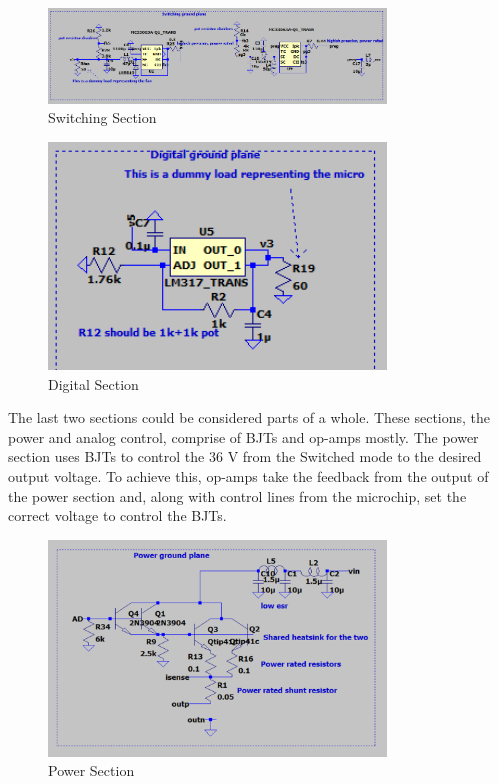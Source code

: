 \documentclass[12pt]{article}
\begin{document}
\begin{figure}[H]
    \centering
    \includegraphics[width=0.8\textwidth]{chase2}
    \caption{Switching Section}
    \label{fig:chase2}
\end{figure}


\begin{figure}[H]
    \centering
    \includegraphics[width=0.8\textwidth]{chase3}
    \caption{Digital Section}
    \label{fig:chase3}
\end{figure}

The last two sections could be considered parts of a whole. These sections, the power and analog control, comprise of BJTs and op-amps mostly. The power section uses BJTs to control the 36 V from the Switched mode to the desired output voltage. To achieve this, op-amps take the feedback from the output of the power section and, along with control lines from the microchip, set the correct voltage to control the BJTs.\\

\begin{figure}[H]
    \centering
    \includegraphics[width=0.8\textwidth]{chase4}
    \caption{Power Section}
    \label{fig:chase4}
\end{figure}
\end{document}
